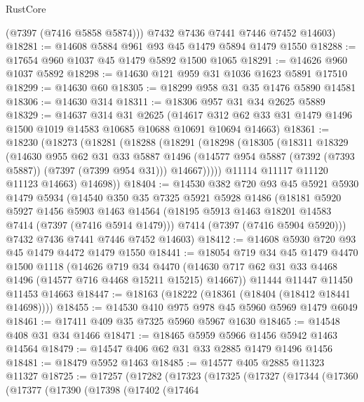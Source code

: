 \begin{lexlean}{RustCore}
\begin{coremodule}
        (@7397 (@7416 @5858 @5874)))
      @7432
      @7436
      @7441
      @7446
      @7452
      @14603)
@18281 := @14608 @5884 @961 @93 @45 @1479 @5894 @1479 @1550
@18288 := @17654 @960 @1037 @45 @1479 @5892 @1500 @1065
@18291 := @14626 @960 @1037 @5892
@18298 := @14630 @121 @959 @31 @1036 @1623 @5891 @17510
@18299 := @14630 @60
@18305 := @18299 @958 @31 @35 @1476 @5890 @14581
@18306 := @14630 @314
@18311 := @18306 @957 @31 @34 @2625 @5889
@18329 := @14637
    @314
    @31
    @2625
    (@14617 @312 @62 @33 @31 @1479 @1496 @1500 @1019 @14583 @10685 @10688 @10691 @10694 @14663)
@18361 := @18230
    (@18273
      (@18281
        (@18288
          (@18291
            (@18298
              (@18305
                (@18311
                  @18329
                  (@14630
                    @955
                    @62
                    @31
                    @33
                    @5887
                    @1496
                    (@14577 @954 @5887 (@7392 (@7393 @5887)) (@7397 (@7399 @954 @31)))
                    @14667)))))
          @11114
          @11117
          @11120
          @11123
          @14663)
        @14698))
@18404 := @14530
    @382
    @720
    @93
    @45
    @5921
    @5930
    @1479
    @5934
    (@14540
      @350
      @35
      @7325
      @5921
      @5928
      @1486
      (@18181
        @5920
        @5927
        @1456
        @5903
        @1463
        @14564
        (@18195 @5913 @1463 @18201 @14583 @7414 (@7397 (@7416 @5914 @1479)))
        @7414
        (@7397 (@7416 @5904 @5920)))
      @7432
      @7436
      @7441
      @7446
      @7452
      @14603)
@18412 := @14608 @5930 @720 @93 @45 @1479 @4472 @1479 @1550
@18441 := @18054
    @719
    @34
    @45
    @1479
    @4470
    @1500
    @1118
    (@14626
      @719
      @34
      @4470
      (@14630 @717 @62 @31 @33 @4468 @1496 (@14577 @716 @4468 @15211 @15215) @14667))
    @11444
    @11447
    @11450
    @11453
    @14663
@18447 := @18163 (@18222 (@18361 (@18404 (@18412 @18441 @14698))))
@18455 := @14530 @410 @975 @978 @45 @5960 @5969 @1479 @6049
@18461 := @17411 @409 @35 @7325 @5960 @5967 @1630
@18465 := @14548 @408 @31 @34 @1466
@18471 := @18465 @5959 @5966 @1456 @5942 @1463 @14564
@18479 := @14547 @406 @62 @31 @33 @2885 @1479 @1496 @1456
@18481 := @18479 @5952 @1463
@18485 := @14577 @405 @2885 @11323 @11327
@18725 := @17257
    (@17282
      (@17323
        (@17325
          (@17327
            (@17344
              (@17360
                (@17377
                  (@17390
                    (@17398
                      (@17402
                        (@17464

\end{coremodule}
\end{lexlean}
